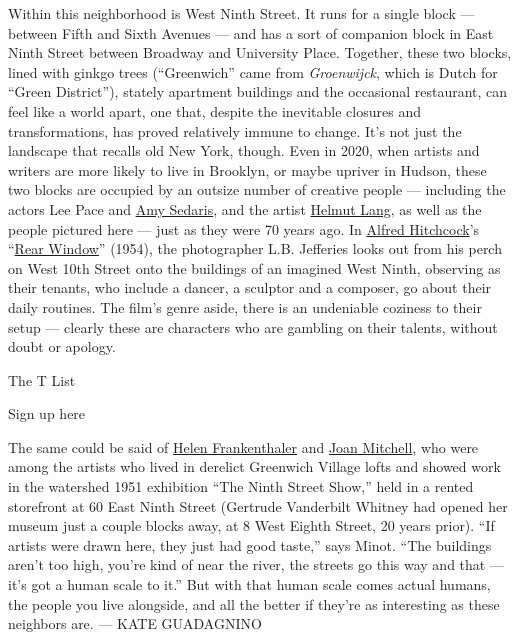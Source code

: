 Within this neighborhood is West Ninth Street. It runs for a single
block --- between Fifth and Sixth Avenues --- and has a sort of
companion block in East Ninth Street between Broadway and University
Place. Together, these two blocks, lined with ginkgo trees
(``Greenwich'' came from \emph{Groenwijck}, which is Dutch for ``Green
District''), stately apartment buildings and the occasional restaurant,
can feel like a world apart, one that, despite the inevitable closures
and transformations, has proved relatively immune to change. It's not
just the landscape that recalls old New York, though. Even in 2020, when
artists and writers are more likely to live in Brooklyn, or maybe
upriver in Hudson, these two blocks are occupied by an outsize number of
creative people --- including the actors Lee Pace and
\href{https://www.nytimes.com/2018/08/22/arts/television/amy-sedaris-emmys.html}{Amy
Sedaris}, and the artist
\href{https://tmagazine.blogs.nytimes.com/2011/07/22/asked-answered-helmut-lang/}{Helmut
Lang}, as well as the people pictured here --- just as they were 70
years ago. In
\href{https://www.nytimes.com/topic/person/alfred-hitchcock}{Alfred
Hitchcock}'s
``\href{https://www.nytimes.com/watching/recommendations/watching-film-rear-window}{Rear
Window}'' (1954), the photographer L.B. Jefferies looks out from his
perch on West 10th Street onto the buildings of an imagined West Ninth,
observing as their tenants, who include a dancer, a sculptor and a
composer, go about their daily routines. The film's genre aside, there
is an undeniable coziness to their setup --- clearly these are
characters who are gambling on their talents, without doubt or apology.

The T List \textbar{}

Sign up here

The same could be said of
\href{https://www.nytimes.com/topic/person/helen-frankenthaler}{Helen
Frankenthaler} and
\href{https://www.nytimes.com/1992/10/31/arts/joan-mitchell-abstract-artist-is-dead-at-66.html}{Joan
Mitchell}, who were among the artists who lived in derelict Greenwich
Village lofts and showed work in the watershed 1951 exhibition ``The
Ninth Street Show,'' held in a rented storefront at 60 East Ninth Street
(Gertrude Vanderbilt Whitney had opened her museum just a couple blocks
away, at 8 West Eighth Street, 20 years prior). ``If artists were drawn
here, they just had good taste,'' says Minot. ``The buildings aren't too
high, you're kind of near the river, the streets go this way and that
--- it's got a human scale to it.'' But with that human scale comes
actual humans, the people you live alongside, and all the better if
they're as interesting as these neighbors are. --- KATE GUADAGNINO

